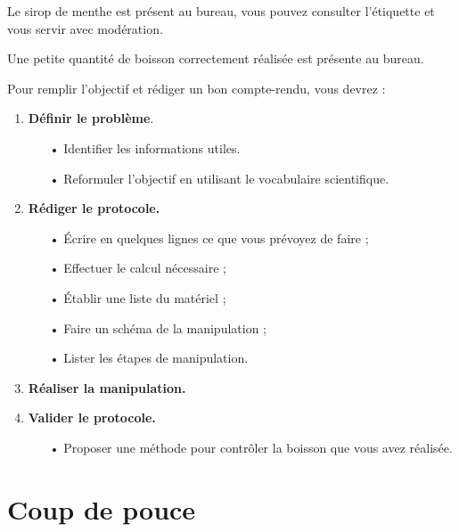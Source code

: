 Le sirop de menthe est présent au bureau, vous pouvez consulter l'étiquette et vous servir avec modération.

Une petite quantité de boisson correctement réalisée est présente au bureau.

Pour remplir l'objectif et rédiger un bon compte-rendu, vous devrez :
\begin{enumerate}
\item \textbf{Définir le problème}.
\begin{itemize}
\item[•] Identifier les informations utiles.
\item[•] Reformuler l'objectif en utilisant le vocabulaire scientifique.
\end{itemize}
\item \textbf{Rédiger le protocole.}
\begin{itemize}
\item[•] Écrire en quelques lignes ce que vous prévoyez de faire ;
\item[•] Effectuer le calcul nécessaire ;
\item[•] Établir une liste du matériel ;
\item[•] Faire un schéma de la manipulation ;
\item[•] Lister les étapes de manipulation.
\end{itemize}
\item \textbf{Réaliser la manipulation.}
\item \textbf{Valider le protocole.}
\begin{itemize}
\item[•] Proposer une méthode pour contrôler la boisson que vous avez réalisée.
\end{itemize}
\end{enumerate}

\section*{Coup de pouce}

